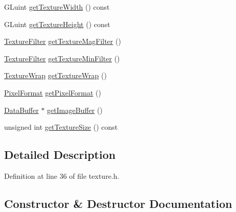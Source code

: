 \begin{DoxyCompactItemize}
\item 
G\+Luint \mbox{\hyperlink{class_open_g_l_1_1_texture_a3dce8a3d16bc4a3a98f0dfa5a8979e4b}{get\+Texture\+Width}} () const
\item 
G\+Luint \mbox{\hyperlink{class_open_g_l_1_1_texture_ae593a5c033d3fc0c801d64771b4bc0fe}{get\+Texture\+Height}} () const
\item 
\mbox{\hyperlink{namespace_open_g_l_a34bc5965567ca64f43e5e38e7cfdb2e4}{Texture\+Filter}} \mbox{\hyperlink{class_open_g_l_1_1_texture_a4624594b4d85149bedcf7f906802c3d7}{get\+Texture\+Mag\+Filter}} ()
\item 
\mbox{\hyperlink{namespace_open_g_l_a34bc5965567ca64f43e5e38e7cfdb2e4}{Texture\+Filter}} \mbox{\hyperlink{class_open_g_l_1_1_texture_a9bc108632436d11c6f1242ea7d301914}{get\+Texture\+Min\+Filter}} ()
\item 
\mbox{\hyperlink{namespace_open_g_l_a22eb6a3df5ed600fb89f2baf8d1c8027}{Texture\+Wrap}} \mbox{\hyperlink{class_open_g_l_1_1_texture_aacf92c2dd4d2e93b483c9fe1978a8aa4}{get\+Texture\+Wrap}} ()
\item 
\mbox{\hyperlink{namespace_open_g_l_a85472a7a9e32091b8a7ed8dc728d505b}{Pixel\+Format}} \mbox{\hyperlink{class_open_g_l_1_1_texture_acc763a16c79059cbbb2ae91b8d5f1f13}{get\+Pixel\+Format}} ()
\item 
\mbox{\hyperlink{class_data_buffer}{Data\+Buffer}} $\ast$ \mbox{\hyperlink{class_open_g_l_1_1_texture_aa47ea4825ad19b5c91b97afad57e1806}{get\+Image\+Buffer}} ()
\item 
unsigned int \mbox{\hyperlink{class_open_g_l_1_1_texture_a85d6c0174b566fee142071e57d6537c9}{get\+Texture\+Size}} () const
\end{DoxyCompactItemize}


\subsection{Detailed Description}


Definition at line 36 of file texture.\+h.



\subsection{Constructor \& Destructor Documentation}
\mbox{\label{class_open_g_l_1_1_texture_a6c275e3f186675ff6ed73ccf970e552f}} 
